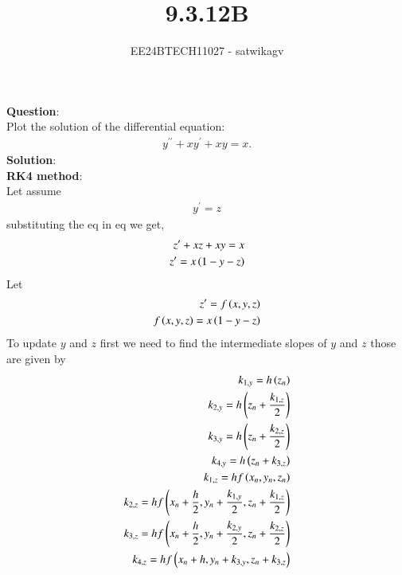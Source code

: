 \documentclass[journal]{IEEEtran}
\begin{document}

\vspace{3cm}

\title{9.3.12B}
\author{EE24BTECH11027 - satwikagv}
{\let\newpage\relax\maketitle}

\renewcommand{\thefigure}{\theenumi}
\renewcommand{\thetable}{\theenumi}
\setlength{\intextsep}{10pt} %


\renewcommand{\thetable}{\theenumi}
\textbf{Question}:\\
Plot the solution of the differential equation: 
\begin{align}
    y^{\prime\prime} +xy^\prime + xy = x. 
\end{align}
\textbf{Solution}:\\
\textbf{RK4 method}:\\
Let assume
\begin{align}
    y^\prime=z
\end{align}
substituting the eq  in eq   we get,
\begin{align}
    z'+xz+xy=x\\
    z'=x\left(1-y-z\right)
\end{align}
Let 
\begin{align}
    z'=f\left(x,y,z\right)\\
    f\left(x,y,z\right)=x\left(1-y-z\right)
\end{align}
To update $y$ and $z$ first we need to find the intermediate slopes of $y$ and $z$ those are given by
\begin{align}
    k_{1,y}=h\left(z_n\right)\\
	k_{2,y}=h\left(z_n+\frac{k_{1,z}}{2}\right)\\
    k_{3,y}=h\left(z_n+\frac{k_{2,z}}{2}\right)\\
    k_{4,y}=h\left(z_n+k_{3,z}\right)\\
    k_{1,z}=hf\left(x_n,y_n,z_n\right)\\
    k_{2,z}=hf\left(x_n+\frac{h}{2},y_n+\frac{k_{1,y}}{2},z_n+\frac{k_{1,z}}{2}\right)\\
    k_{3,z}=hf\left(x_n+\frac{h}{2},y_n+\frac{k_{2,y}}{2},z_n+\frac{k_{2,z}}{2}\right)\\
    k_{4,z}=hf\left(x_n+h,y_n+k_{3,y},z_n+k_{3,z}\right)
\end{align} 
\end{document}
